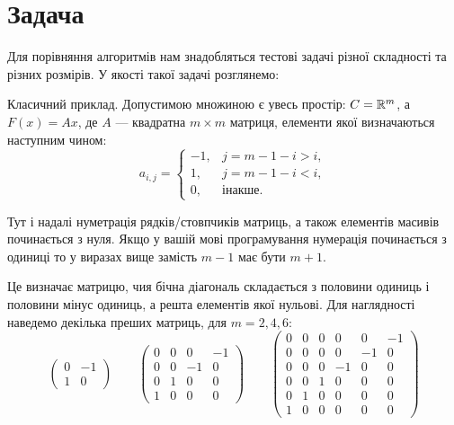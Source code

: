 \section{Задача}
Для порівняння алгоритмів нам знадобляться тестові задачі різної складності та різних розмірів. У якості такої задачі розглянемо:

\begin{problem}
    Класичний приклад. Допустимою множиною є увесь простір: $C = \mathbb{R}^m$, а $F(x) = Ax$, де $A$ --- квадратна $m \times m$ матриця, елементи якої визначаються наступним чином:
    \begin{equation}
        a_{i,j} = \begin{cases}
            -1, & j = m - 1 - i > i, \\
            1, & j = m - 1 - i < i, \\
            0, & \text{інакше}.
        \end{cases}
    \end{equation}
    
    \begin{remark}
        Тут і надалі нуметрація рядків/стовпчиків матриць, а також елементів масивів починається з нуля. Якщо у вашій мові програмування нумерація починається з одиниці то у виразах вище замість $m - 1$ має бути $m + 1$.
    \end{remark}
    
    Це визначає матрицю, чия бічна діагональ складається з половини одиниць і половини мінус одиниць, а решта елементів якої нульові. Для наглядності наведемо декілька преших матриць, для $m = 2, 4, 6$:
    \begin{equation}
        \begin{pmatrix}
            0 & -1 \\
            1 & 0
        \end{pmatrix}
        \qquad
        \begin{pmatrix}
            0 & 0 & 0 & -1 \\
            0 & 0 & -1 & 0 \\
            0 & 1 & 0 & 0 \\
            1 & 0 & 0 & 0
        \end{pmatrix}
        \qquad
        \begin{pmatrix}
            0 & 0 & 0 & 0 & 0 & -1 \\
            0 & 0 & 0 & 0 & -1 & 0 \\
            0 & 0 & 0 & -1 & 0 & 0 \\
            0 & 0 & 1 & 0 & 0 & 0 \\
            0 & 1 & 0 & 0 & 0 & 0 \\
            1 & 0 & 0 & 0 & 0 & 0
        \end{pmatrix}
    \end{equation}
    

\end{problem}

